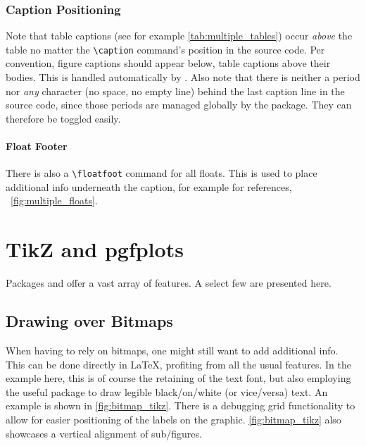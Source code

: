 \subsubsection{Caption Positioning}

Note that table captions (see for example \cref{tab:multiple_tables}) occur
\emph{above} the table no matter the \verb|\caption| command's position in
the source code.
Per convention, figure captions should appear below, table captions above their bodies.
This is handled automatically by .
Also note that there is neither a period nor \emph{any} character
(no space, no empty line) behind the last caption line in the source code,
since those periods are managed globally by the  package.
They can therefore be toggled easily.

\paragraph{Float Footer}
There is also a \verb|\floatfoot| command for all floats.
This is used to place additional info underneath the caption, for example for
references, \ \cref{fig:multiple_floats}.

\section{TikZ and pgfplots}
Packages  and  offer a vast array of features.
A select few are presented here.

\subsection{Drawing over Bitmaps}

When having to rely on bitmaps, one might still want to add additional info.
This can be done directly in \LaTeX{}, profiting from all the usual features.
In the example here, this is of course the retaining of the text font, but also
employing the useful  package to draw legible black\-/on\-/white
(or vice\-/versa) text.
An example is shown in \cref{fig:bitmap_tikz}.
There is a debugging grid functionality to allow for easier positioning of the labels
on the graphic.
\cref{fig:bitmap_tikz} also showcases a vertical alignment of sub\-/figures.

